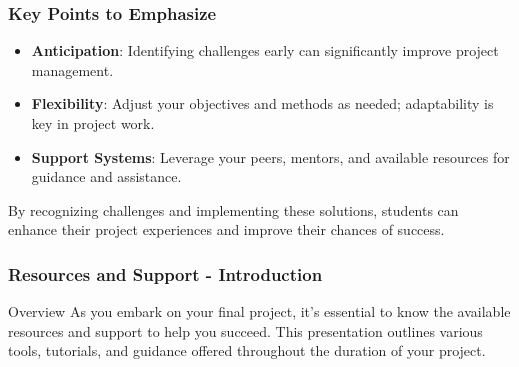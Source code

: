 \documentclass[aspectratio=169]{beamer}
\begin{document}
\begin{frame}[fragile]
  \frametitle{Key Points to Emphasize}
  \begin{itemize}
    \item \textbf{Anticipation}: Identifying challenges early can significantly improve project management.
    \item \textbf{Flexibility}: Adjust your objectives and methods as needed; adaptability is key in project work.
    \item \textbf{Support Systems}: Leverage your peers, mentors, and available resources for guidance and assistance.
  \end{itemize}
  By recognizing challenges and implementing these solutions, students can enhance their project experiences and improve their chances of success.
\end{frame}

\begin{frame}[fragile]
    \frametitle{Resources and Support - Introduction}
    \begin{block}{Overview}
        As you embark on your final project, it's essential to know the available resources and support to help you succeed. 
        This presentation outlines various tools, tutorials, and guidance offered throughout the duration of your project.
    \end{block}
\end{frame}
\end{document}
